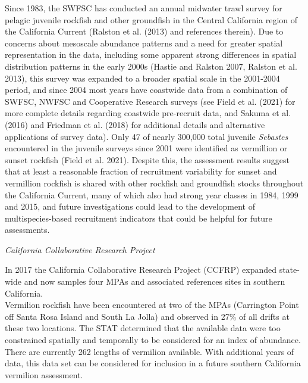 \documentclass[11pt,
  english,
  a4paper,
]{article}
\begin{document}
Since 1983, the SWFSC has conducted an annual midwater trawl survey for pelagic juvenile rockfish and other groundfish in the Central California region of the California Current (Ralston et al. {(2013)\leavevmode\tagmcend\tagstructend} and references therein). Due to concerns about mesoscale abundance patterns and a need for greater spatial representation in the data, including some apparent strong differences in spatial distribution patterns in the early 2000s {(Hastie and Ralston 2007, Ralston et al. 2013)\leavevmode\tagmcend\tagstructend}, this survey was expanded to a broader spatial scale in the 2001-2004 period, and since 2004 most years have coastwide data from a combination of SWFSC, NWFSC and Cooperative Research surveys (see Field et al. {(2021)\leavevmode\tagmcend\tagstructend} for more complete details regarding coastwide pre-recruit data, and Sakuma et al. {(2016)\leavevmode\tagmcend\tagstructend} and Friedman et al. {(2018)\leavevmode\tagmcend\tagstructend} for additional details and alternative applications of survey data). Only 47 of nearly 300,000 total juvenile \emph{Sebastes} encountered in the juvenile surveys since 2001 were identified as vermillion or sunset rockfish {(Field et al. 2021)\leavevmode\tagmcend\tagstructend}. Despite this, the assessment results suggest that at least a reasonable fraction of recruitment variability for sunset and vermillion rockfish is shared with other rockfish and groundfish stocks throughout the California Current, many of which also had strong year classes in 1984, 1999 and 2015, and future investigations could lead to the development of multispecies-based recruitment indicators that could be helpful for future assessments.

\emph{California Collaborative Research Project}

In 2017 the California Collaborative Research Project (CCFRP) expanded state-wide and now samples four MPAs and associated references sites in southern California.\\
Vermilion rockfish have been encountered at two of the MPAs (Carrington Point off Santa Rosa Island and South La Jolla) and observed in 27\% of all drifts at these two locations. The STAT determined that the available data were too constrained spatially and temporally to be considered for an index of abundance. There are currently 262 lengths of vermilion available. With additional years of data, this data set can be considered for inclusion in a future southern California vermilion assessment.
\end{document}
